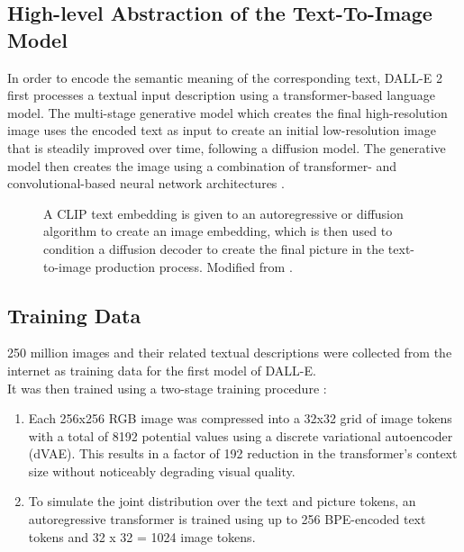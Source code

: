 \documentclass[10pt,twocolumn,twoside]{osajnl}
\begin{document}
\subsection{High-level Abstraction of the Text-To-Image Model}
In order to encode the semantic meaning of the corresponding text, DALL-E 2 first processes a textual input description using a transformer-based language model. 
The multi-stage generative model which creates the final high-resolution image uses the encoded text as input to create an initial low-resolution image that is steadily improved over time, following a diffusion model. 
The generative model then creates the image using a combination of transformer- and convolutional-based neural network architectures \cite{T2IReview}. 

\begin{figure} [h]
	\centering
	\caption{A CLIP text embedding is given to an autoregressive or diffusion algorithm to create an image embedding, which is then used to condition a diffusion decoder to create the final picture in the text-to-image production process. Modified from \cite{CLIP}.}
\end{figure}

\subsection{Training Data}
250 million images and their related textual descriptions were collected from the internet as training data for the first model of DALL-E.\\
It was then trained using a two-stage training procedure \cite{zeroShot}:
\begin{enumerate}
	\item Each 256x256 RGB image was compressed into a 32x32 grid of image tokens with a total of 8192 potential values using a discrete variational autoencoder (dVAE). This results in a factor of 192 reduction in the transformer's context size without noticeably degrading visual quality.
	\item To simulate the joint distribution over the text and picture tokens, an autoregressive transformer is trained using up to 256 BPE-encoded text tokens and 32 x 32 = 1024 image tokens.
\end{enumerate}
\end{document}
